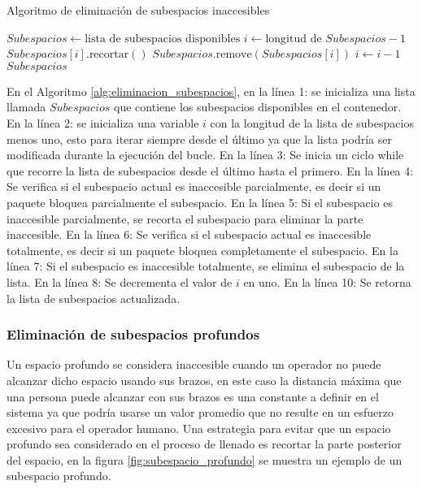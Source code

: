 \begin{algorithm}[H]
    \caption{Algoritmo de eliminación de subespacios inaccesibles}
    \label{alg:eliminacion_subespacios}
    \begin{algorithmic}[1]
        \State $Subespacios \gets \text{lista de subespacios disponibles}$
        \State $i \gets \text{longitud de } Subespacios - 1$
        \State $Subespacios[i].\text{recortar}()$
        \State $Subespacios.\text{remove}(Subespacios[i])$
        \EndIf
        \State $i \gets i - 1$
        \EndWhile
        \State \Return $Subespacios$
    \end{algorithmic}
\end{algorithm}

En el Algoritmo \ref{alg:eliminacion_subespacios}, en la línea 1: se inicializa una lista llamada $Subespacios$ que contiene los subespacios disponibles en el contenedor. En la línea 2: se inicializa una variable $i$ con la longitud de la lista de subespacios menos uno, esto para iterar siempre desde el último ya que la lista podría ser modificada durante la ejecución del bucle. En la línea 3: Se inicia un ciclo while que recorre la lista de subespacios desde el último hasta el primero. En la línea 4: Se verifica si el subespacio actual es inaccesible parcialmente, es decir si un paquete bloquea parcialmente el subespacio. En la línea 5: Si el subespacio es inaccesible parcialmente, se recorta el subespacio para eliminar la parte inaccesible. En la línea 6: Se verifica si el subespacio actual es inaccesible totalmente, es decir si un paquete bloquea completamente el subespacio. En la línea 7: Si el subespacio es inaccesible totalmente, se elimina el subespacio de la lista. En la línea 8: Se decrementa el valor de $i$ en uno. En la línea 10: Se retorna la lista de subespacios actualizada.

\subsubsection{Eliminación de subespacios profundos}

Un espacio profundo se considera inaccesible cuando un operador no puede alcanzar dicho espacio usando sus brazos, en este caso la distancia máxima que una persona puede alcanzar con sus brazos es una constante a definir en el sistema ya que podría usarse un valor promedio que no resulte en un esfuerzo excesivo para el operador humano. Una estrategia para evitar que un espacio profundo sea considerado en el proceso de llenado es recortar la parte posterior del espacio, en la figura \ref{fig:subespacio_profundo} se muestra un ejemplo de un subespacio profundo.

